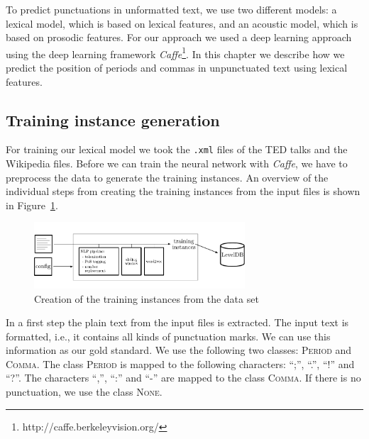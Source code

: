 To predict punctuations in unformatted text, we use two different models: a lexical model, which is based on lexical features, and an acoustic model, which is based on prosodic features.
For our approach we used a deep learning approach using the deep learning framework \emph{Caffe}\footnote{http://caffe.berkeleyvision.org/}.
In this chapter we describe how we predict the position of periods and commas in unpunctuated text using lexical features.

\subsection{Training instance generation}
For training our lexical model we took the \texttt{.xml} files of the TED talks and the Wikipedia files.
Before we can train the neural network with \emph{Caffe}, we have to preprocess the data to generate the training instances.
An overview of the individual steps from creating the training instances from the input files is shown in Figure~\ref{fig:overview_lexical}.
\begin{figure}[ht]
    \centering
    \includegraphics[width=0.7\textwidth]{img/overview_lexical.pdf}
    \caption{Creation of the training instances from the data set}
    \label{fig:overview_lexical}
\end{figure}

In a first step the plain text from the input files is extracted.
The input text is formatted, i.e., it contains all kinds of punctuation marks.
We can use this information as our gold standard.
We use the following two classes: \textsc{Period} and \textsc{Comma}.
The class \textsc{Period} is mapped to the following characters: ``;'', ``.'', ``!'' and ``?''.
The characters ``,'', ``:'' and ``-'' are mapped to the class \textsc{Comma}.
If there is no punctuation, we use the class \textsc{None}.

